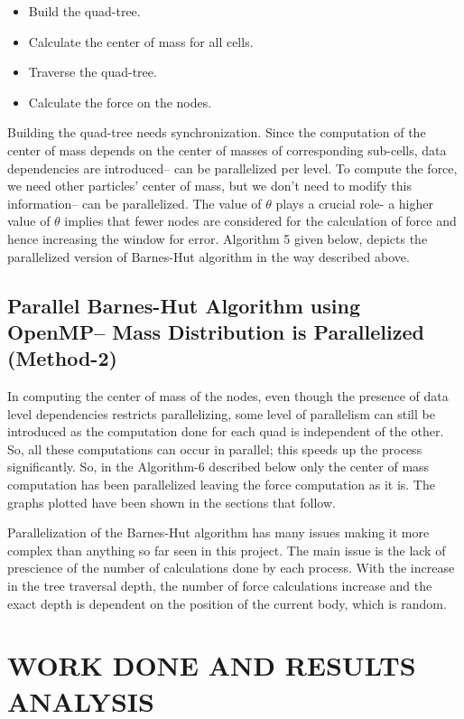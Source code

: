 \documentclass[letterpaper, 10 pt, conference]{ieeeconf}
\begin{document}
    \begin{itemize}
        \item Build the quad-tree.
        \item Calculate the center of mass for all cells.
        \item Traverse the quad-tree.
        \item Calculate the force on the nodes.
    \end{itemize}

    Building the quad-tree needs synchronization. Since the computation of the center of mass depends on the center of masses of corresponding sub-cells, data dependencies are introduced{--} can be parallelized per level. To compute the force, we need other particles' center of mass, but we don't need to modify this information{--} can be parallelized. The value of $\theta$ plays a crucial role- a higher value of $\theta$ implies that fewer nodes are considered for the calculation of force and hence increasing the window for error. Algorithm 5 given below, depicts the parallelized version of Barnes-Hut algorithm in the way described above.

    \subsection{Parallel Barnes-Hut Algorithm using OpenMP{--} Mass Distribution is Parallelized (Method-2)}

    In computing the center of mass of the nodes, even though the presence of data level dependencies restricts parallelizing, some level of parallelism can still be introduced as the computation done for each quad is independent of the other. So, all these computations can occur in parallel; this speeds up the process significantly. So, in the Algorithm-6 described below only the center of mass computation has been parallelized leaving the force computation as it is. The graphs plotted have been shown in the sections that follow. \par

    Parallelization of the Barnes-Hut algorithm has many issues making it more complex than anything so far seen in this project. The main issue is the lack of prescience of the number of calculations done by each process. With the increase in the tree traversal depth, the number of force calculations increase and the exact depth is dependent on the position of the current body, which is random.


    \section{WORK DONE AND RESULTS ANALYSIS}
\end{document}
